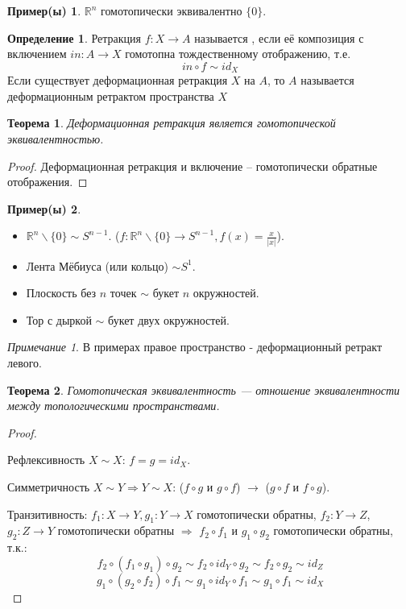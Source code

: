 \documentclass[a4paper]{article}
\theoremstyle{indented}
\newtheorem{theorem}{Теорема}
\theoremstyle{definition}
\newtheorem{defn}{Определение}
\newtheorem*{exl}{Пример(ы)}
\theoremstyle{remark}
\newtheorem*{remark}{Примечание}
\DeclareMathOperator{\Ra}{\Rightarrow}
\begin{document}
\begin{exl}
    $\mathbb{R}^n$ гомотопически эквивалентно $\{0\}$.
\end{exl} 

\begin{defn}
    Ретракция $f : X \to A$ называется , если её композиция с включением $in: A \to X$ гомотопна тождественному отображению, т.е. $$in \circ f \sim id_X$$
Если существует деформационная ретракция $X$ на $A$, то $A$ называется деформационным ретрактом пространства $X$
\end{defn}

\begin{theorem}
    Деформационная ретракция является гомотопической эквивалентностью.
\end{theorem}

\begin{proof}
    Деформационная ретракция и включение – гомотопически
обратные отображения.
\end{proof}

\begin{exl}\

    \begin{itemize}
        \item $\mathbb{R}^n \backslash \{0\} \sim S^{n-1}$. ($f: \mathbb{R}^n \backslash \{0\} \to S^{n-1},  f(x)=\frac{x}{|x|}$).
        \item Лента Мёбиуса (или кольцо) $\sim S^1$.
        \item Плоскость без $n$ точек $\sim$ букет $n$ окружностей.
        \item Тор с дыркой $\sim$ букет двух окружностей.
    \end{itemize}
\end{exl}

\begin{remark}
    В примерах правое пространство - деформационный ретракт левого.
\end{remark}

\begin{theorem}
    Гомотопическая эквивалентность — отношение эквивалентности
между топологическими пространствами.
\end{theorem}

\begin{proof}\

    Рефлексивность $X \sim X$: $f=g=id_X$.
    
    Симметричность $X \sim Y \Ra Y \sim X$: ($f\circ g$ и $g\circ f$) $\to$ ($g\circ f$ и $f\circ g$).
    
    Транзитивность: $f_{1}: X\to Y, g_{1}: Y\to X$ гомотопически обратны, $f_{2}: Y\to Z$, \\$g_{2}: Z\to Y$ гомотопически обратны $\Ra$ $f_{2} \circ f_{1}$ и $g_{1} \circ g_{2}$ гомотопически обратны, т.к.:
    $$ f_{2} \circ (f_{1} \circ g_{1}) \circ g_{2} 
    \sim f_{2} \circ id_Y \circ g_{2} \sim  f_{2} \circ g_{2} 
    \sim id_Z$$
    $$g_{1} \circ (g_{2} \circ f_{2}) \circ f_{1}
    \sim g_{1} \circ id_Y \circ f_{1} \sim  g_{1} \circ f_{1} 
    \sim id_X$$
\end{proof}
\end{document}
